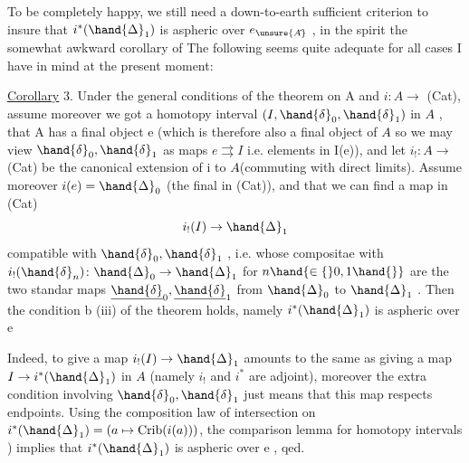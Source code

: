 
To be completely happy, we still need a down-to-earth  sufficient
criterion to insure that $i^{*}(\hand{\Delta}_1)$ is aspheric over $e_{\unsure{A\hat{}}}$ , in the spirit 
the somewhat awkward \inserted{[deleted]} corollary of  The following seems quite
adequate for all cases I have in mind at the present moment:

\uline{Corollary} 3. Under the general conditions of the theorem on A and 
$i\colon A\longrightarrow$ (Cat), assume moreover we got a homotopy interval $(I,\hand{\delta}_0,\hand{\delta}_1)$ in
$A\hat{}$ \hand{*}, that A has a final object e (which is therefore also a final object
of $A\hat{}$ so we may view $\hand{\delta}_0,\hand{\delta}_1$ as maps $e\rightrightarrows I$ \deleted{\unsure{;}} i.e. elements in I(e)), and
let $i_!\colon A\hat{}\longrightarrow$ (Cat) be the canonical extension of i to $A\hat{}$(commuting with
direct limits). Assume moreover $i(e)=\hand{\Delta}_0$ (the final  in (Cat)),
and that we can find a map in (Cat)
\[ i_!(I)\to\hand{\Delta}_1 \]
compatible with $\hand{\delta}_0,\hand{\delta}_1$ , i.e. whose compositae with $i_!(\hand{\delta}_n)\colon\hand{\Delta}_0\to\hand{\Delta}_1$
for $n\hand{\in\{}0,1\hand{\}}$ are the two standar maps $\underline{\hand{\delta}}_0,\underline{\hand{\delta}}_1$ from $\hand{\Delta}_0$ to $\hand{\Delta}_1$ . Then the
condition b (iii) of the theorem holds, namely $i^{*}(\hand{\Delta}_1)$ is aspheric over e

Indeed, to give a map $i_!(I)\to\hand{\Delta}_1$  amounts to the same as giving
a map $I\to i^{*}(\hand{\Delta}_1)$ in $A\hat{}$ (namely $i_!$ and $i^{*}$ are adjoint), moreover the extra
condition involving $\hand{\delta}_0,\hand{\delta}_1$ just means that this map respects endpoints.
Using the composition law of intersection on $i^{*}(\hand{\Delta}_1)=(a\mapsto\mathrm{Crib}(i(a)))$,
the comparison  lemma for homotopy intervals ) \inserted{,} implies that
$i^{*}(\hand{\Delta}_1)$ is aspheric over e , qed.

